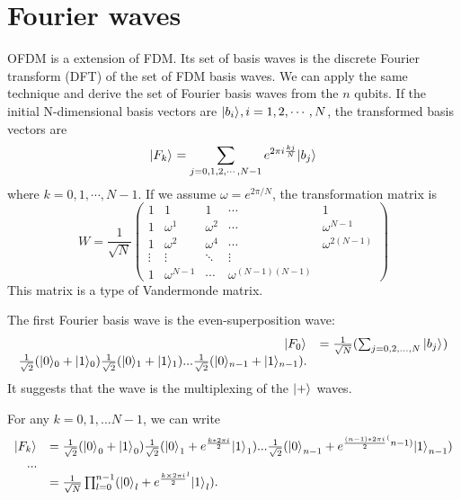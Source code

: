\documentclass[oneside, letter, 12pt]{book}
\begin{document}
\section{Fourier waves}
OFDM is a extension of FDM. Its set of basis waves is the discrete Fourier transform (DFT) of the set of FDM basis waves. We can apply the same technique and derive the set of Fourier basis waves from the $n$ qubits. If the initial N-dimensional basis vectors are $\keta{b_i}, i=1,2, \cdots, N$, the transformed basis vectors are
\begin{equation}
    \keta{F_k} = \sum_{j=0, 1, 2, \cdots , N-1} e^{ 2 \pi i \frac {kj} N} \keta{b_j}
\end{equation}
where $k=0, 1, \cdots, N-1$.
If we assume $\omega = e^{ 2 \pi/N}$, the transformation matrix is
\begin{equation}
    W = \frac 1 {\sqrt{N}}
    \begin{pmatrix}
1 & 1 & 1 &  \cdots & 1 \\
1 & \omega^1 & \omega^2 & \cdots & \omega^{N-1} \\
1 & \omega^2 & \omega^4 & \cdots & \omega^{2(N-1)} \\
\vdots & \vdots & \ddots & \vdots \\
1 & \omega^{N-1} & \cdots & \omega^{(N-1)(N-1)}
\end{pmatrix}
\end{equation}
This matrix is a type of Vandermonde matrix.

The first Fourier basis wave is the even-superposition wave:
\begin{equation}
\begin{array}{rl}
    \keta{F_0} &= \frac 1 {\sqrt{N}} ( \sum_{j=0, 2, ..., N} \keta{b_j} ) \\
    \frac 1 {\sqrt{2}} (\keta[0]{0}+\keta[0]{1}) \frac 1 {\sqrt{2}} (\keta[1]{0}+\keta[1]{1})
    ... \frac 1 {\sqrt{2}} (\keta[n-1]{0}+\keta[n-1]{1}).
 \end{array}
\end{equation}
It suggests that the wave is the multiplexing of the $\keta{+}$ waves.

For any $k=0, 1, ...N-1$, we can write
\begin{equation}
\begin{array}{rl}
\keta{F_k} &= \frac 1 {\sqrt{2}} ({\keta{0}}_0+{\keta{1}}_0)
    \frac 1 {\sqrt{2}} ({\keta{0}}_1+e^{\frac {k*2 \pi i} 2}{\keta{1}}_1)
    ...  \frac 1 {\sqrt{2}} ({\keta{0}}_{n-1}+e^{\frac {(n-1)*2\pi i} 2^(n-1)}{\keta{1}}_{n-1}) \\
    ... \\
    &= \frac 1 {\sqrt{N}} \prod^{n-1}_{l=0} ({\keta{0}}_l+e^{\frac {k \times 2\pi i} 2^l}{\keta{1}}_l).
\end{array}
\end{equation}
\end{document}
